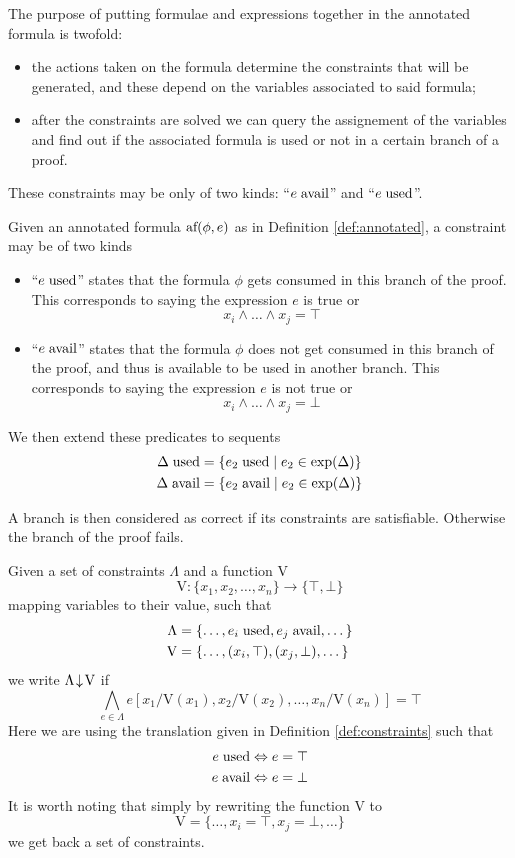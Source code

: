 \documentclass[a4paper, 12pt, english]{report}
\begin{document}
\noindent The purpose of putting formulae and expressions together in the annotated formula is twofold:
\begin{itemize}
	\item the actions taken on the formula determine the constraints that will be generated, and these depend on the variables associated to said formula;
	\item after the constraints are solved we can query the assignement of the variables and find out if the associated formula is used or not in a certain branch of a proof.
\end{itemize}
These constraints may be only of two kinds: ``$e \; \text{avail}$'' and ``$e \; \text{used}$''.
\begin{define}[Constraints]
	\label{def:constraints}
	Given an annotated formula $\text{af}(\phi, e)$ as in Definition \ref{def:annotated}, a constraint may be of two kinds
	\begin{itemize}
		\item ``$e \; \text{used}$'' states that the formula $\phi$ gets consumed in this branch of the proof.
			This corresponds to saying the expression $e$ is true or
			$$ x_i \wedge \dots \wedge x_j = \top $$
		\item ``$e \; \text{avail}$'' states that the formula $\phi$ does not get consumed in this branch of the proof, and thus is available to be used in another branch.
			This corresponds to saying the expression $e$ is not true or
			$$ x_i \wedge \dots \wedge x_j = \bot $$
	\end{itemize}
	We then extend these predicates to sequents
	\begin{align*}
		\Delta \; \text{used} &= \{ e_2 \; \text{used} \mid e_2 \in \text{exp}(\Delta) \} \\
		\Delta \; \text{avail} &= \{ e_2 \; \text{avail} \mid e_2 \in \text{exp}(\Delta) \}
	\end{align*}
\end{define}
A branch is then considered as correct if its constraints are satisfiable.
Otherwise the branch of the proof fails.
\begin{define}
	\label{def:sat}
	Given a set of constraints $\Lambda$ and a function V
	$$ \text{V} : \{ x_1, x_2, \dots, x_n \} \rightarrow \{ \top, \bot \} $$
	mapping variables to their value, such that
	\begin{align*}
		\Lambda &= \{ \dots, e_i \; \text{used}, e_j \; \text{avail}, \dots \} \\
		\text{V}&= \{ \dots, (x_i, \top), (x_j, \bot), \dots \}
	\end{align*}
	we write $\Lambda\!\downarrow\!\text{V}$ if 
	$$ \bigwedge_{e \in \Lambda} e[x_1 / \text{V}(x_1), x_2 / \text{V}(x_2), \dots, x_n / \text{V}(x_n)] = \top $$
	Here we are using the translation given in Definition \ref{def:constraints} such that
	\begin{align*}
		e \; \text{used} &\Leftrightarrow e = \top \\
		e \; \text{avail} &\Leftrightarrow e = \bot
	\end{align*}
	It is worth noting that simply by rewriting the function V to
	$$ \text{V} = \{ \dots, x_i = \top, x_j = \bot, \dots \} $$
	we get back a set of constraints.
\end{define}
\end{document}
